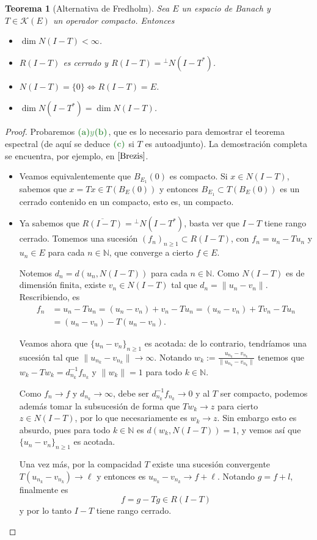 \documentclass[11pt]{report}
\theoremstyle{colored}
\newtheorem{theorem}{Teorema}[section]
\newcommand{\N}{\mathbb{N}}
\newcommand{\paint}[1]{\color{color}{#1}}
\newcommand{\tpaint}[1]{\paint{\textbf{#1}}}
\begin{document}
\begin{theorem}[Alternativa de Fredholm] Sea $E$ un espacio de Banach y $T \in \mathscr{K}(E)$ un operador compacto. Entonces
\begin{itemize}
\item[(a)] $\dim N(I-T) < \infty$.
\item[(b)] $R(I-T)$ es cerrado y $R(I-T) = {}^\perp N(I-T^*)$.
\item[(c)] $N(I-T) = \{0\} \iff R(I-T) = E$.
\item[(d)] $\dim N(I-T^*) = \dim N(I-T)$.
\end{itemize} 
\end{theorem}
\begin{proof} Probaremos $\tpaint{(a)$ y $(b)}$, que es lo necesario para demostrar el teorema espectral (de aquí se deduce $\tpaint{(c)}$ si $T$ es autoadjunto). La demostración completa se encuentra, por ejemplo, en $\cite{Brezis}$.
\begin{itemize}[listparindent = \parindent]
\item[(a)] Veamos equivalentemente que $B_{E_1}(0)$ es compacto. Si $x \in N(I-T)$, sabemos que $x = Tx \in T(B_E(0))$ y entonces $B_{E_1} \subset T(B_E(0))$ es un cerrado contenido en un compacto, esto es, un compacto.
\item[(b)] Ya sabemos que $\overline{R(I-T)} = {}^\perp N(I-T^*)$, basta ver que $I-T$ tiene rango cerrado. Tomemos una sucesión $(f_n)_{n \geq 1} \subset R(I-T)$, con $f_n = u_n - Tu_n$ y $u_n \in E$ para cada $n \in \N$, que converge a cierto $f \in E$.

Notemos $d_n = d(u_n, N(I-T))$ para cada $n \in \N$. Como $N(I-T)$ es de dimensión finita, existe $v_n \in N(I-T)$ tal que $d_n = \|u_n-v_n\|$. Rescribiendo, es
\begin{align*}
f_n &= u_n - Tu_n = (u_n - v_n) + v_n - Tu_n = (u_n - v_n) + Tv_n - Tu_n\\
&= (u_n-v_n) -T(u_n-v_n).
\end{align*}

Veamos ahora que $\{u_n-v_n\}_{n \geq 1}$ es acotada: de lo contrario, tendríamos una sucesión tal que $\|u_{n_k}-v_{n_k}\| \to \infty$. Notando $w_k := \frac{u_{n_k}-v_{n_k}}{\|u_{n_k}-v_{n_k}\|}$ tenemos que $w_k - Tw_k = d_{n_k}^{-1}f_{n_k}$ y $\|w_k\| = 1$ para todo $k \in \N$. 

Como $f_n \to f$ y $d_{n_k} \to \infty$, debe ser $d_{n_k}^{-1}f_{n_k} \to 0$ y al $T$ ser compacto, podemos además tomar la subsucesión de forma que $Tw_k \to z$ para cierto $z \in N(I-T)$, por lo que necesariamente es $w_k \to z$. Sin embargo esto es absurdo, pues para todo $k \in \N$ es $d(w_k,N(I-T)) = 1$, y vemos así que $\{u_n-v_n\}_{n \geq 1}$ es acotada.

Una vez más, por la compacidad $T$ existe una sucesión convergente $T(u_{n_k}-v_{n_k}) \to \ell$ y entonces es $u_{n_k}-v_{n_k} \to f+\ell$. Notando $g = f+l$, finalmente es
\[
f = g -Tg \in R(I-T)
\]
y por lo tanto $I-T$ tiene rango cerrado.
\end{itemize}
\end{proof}
\end{document}
